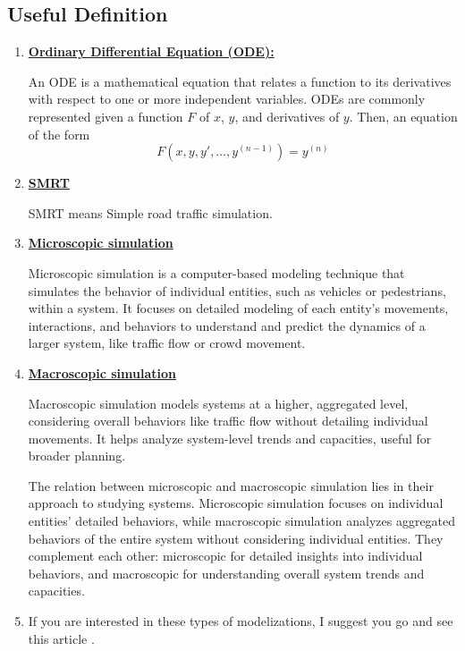 \documentclass{article}
\begin{document}
	\subsection{Useful Definition}
	\begin{enumerate}
		\item \textbf{\underline{Ordinary Differential Equation (ODE):}} 
		
		An ODE is a mathematical equation that relates a function to its derivatives with respect to one or more independent variables. ODEs are commonly represented given a function \( F \) of \( x \), \( y \), and derivatives of \( y \). Then, an equation of the form
		\[
		F\left(x,y,y',\ldots ,y^{(n-1)}\right)=y^{(n)}
		\]
		
		\item \textbf{\underline{SMRT}}
		
		SMRT means Simple road traffic simulation.
		
		\item \textbf{\underline{Microscopic simulation}}
		
		Microscopic simulation is a computer-based modeling technique that simulates the behavior of individual entities, such as vehicles or pedestrians, within a system. It focuses on detailed modeling of each entity's movements, interactions, and behaviors to understand and predict the dynamics of a larger system, like traffic flow or crowd movement.
		
		\item \textbf{\underline{Macroscopic simulation}}
		
		Macroscopic simulation models systems at a higher, aggregated level, considering overall behaviors like traffic flow without detailing individual movements. It helps analyze system-level trends and capacities, useful for broader planning.
		
		The relation between microscopic and macroscopic simulation lies in their approach to studying systems. Microscopic simulation focuses on individual entities' detailed behaviors, while macroscopic simulation analyzes aggregated behaviors of the entire system without considering individual entities. They complement each other: microscopic for detailed insights into individual behaviors, and macroscopic for understanding overall system trends and capacities.
		
		\item If you are interested in these types of modelizations, I suggest you go and see this article \cite{dugois:tel-01505473}.
	\end{enumerate}
	
\end{document}
